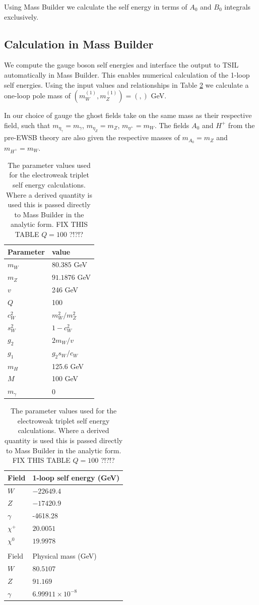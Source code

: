 \documentclass[11pt]{article}
\begin{document}
Using Mass Builder we calculate the self energy in terms of $A_0$ and $B_0$ integrals exclusively.



\subsection{Calculation in Mass Builder}

We compute the gauge boson self energies and interface the output to TSIL automatically in Mass Builder.  This enables numerical calculation of the 1-loop self energies.  Using the input values and relationships in Table \ref{table:input_params} we calculate a one-loop pole mass of $(m_W^{(1)},m_Z^{(1)}) = ( , )$ GeV.

In our choice of gauge the ghost fields take on the same mass as their respective field, such that $m_{\eta_{\gamma}} = m_{\gamma}$, $m_{\eta_Z}=m_{Z}$, $m_{\eta^+}=m_{W}$.  The fields $A_0$ and $H^+$ from the pre-EWSB theory are also given the respective masses of $m_{A_0}=m_Z$ and $m_{H^+}=m_W$.


\begin{table}[tp]
\caption{The parameter values used for the electroweak triplet self energy calculations.  Where a derived quantity is used this is passed directly to Mass Builder in the analytic form. FIX THIS TABLE $Q=100$ ?!?!?}\label{table:input_params}
\centering
\begin{tabular}{l l}
\hline
Parameter & value\\
\hline
$m_W$ & $80.385$ GeV \\
$m_Z$ & $91.1876$ GeV \\
$v$ & 246 GeV \\
$Q$ & 100 \\
$c_W^2$ & $m^2_W/m^2_Z$ \\
$s_W^2$ & $1-c^2_W$ \\
$g_2$ & $2m_W/v$\\
$g_1$ & $g_2 s_W/c_W$\\
$m_H$ & 125.6 GeV\\
$M$ & 100 GeV\\
$m_{\gamma}$ & 0 \\
\hline\end{tabular}
\hspace{3cm}
\begin{tabular}{l l}
\hline
Field & 1-loop self energy (GeV)\\
\hline
$W$ & $-22649.4$ \\
$Z$ & $-17420.9$  \\
$\gamma$ & -4618.28 \\
$\chi^+$ & $20.0051$ \\
$\chi^0$ & $19.9978$ \\
&\\
\hline
Field & Physical mass (GeV)\\
\hline
$W$ & $80.5107$ \\
$Z$ & $91.169$  \\
$\gamma$ & $6.99911\times 10^{-8}$\\
\hline\end{tabular}
\end{table}
\end{document}
